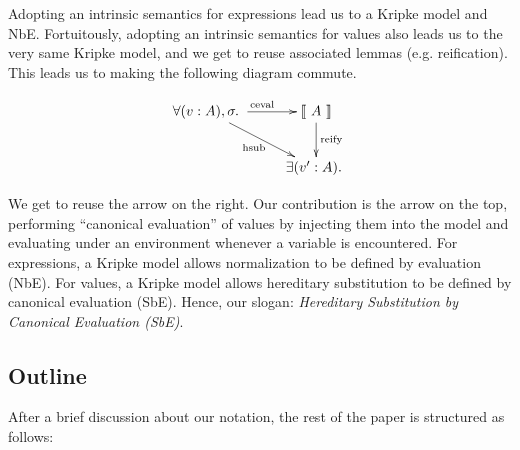 \documentclass[preprint,nonatbib]{sigplanconf}
\numberwithin{mysubdfn}{mydfn}
\newcommand{\ascribe}[2]{(#1 : #2)}
\newcommand{\all}[1]{\forall#1.~}
\newcommand{\ex}[1]{\exists#1.~}
\newcommand{\el}[1]{\llbracket ~ #1 ~ \rrbracket}
\newcommand{\fun}[1]{\textmd{#1}}
\begin{document}
Adopting an intrinsic semantics for expressions lead us to a Kripke
model and NbE. Fortuitously, adopting an intrinsic semantics for
values also leads us to the very same Kripke model, and we get to
reuse associated lemmas (e.g. reification). This leads us to making
the following diagram commute.

\begin{displaymath}
    \xymatrix{
          \all{\ascribe{v}{A}, \sigma}
          \ar[dr]_{\fun{hsub}}
          \ar[r]^{\fun{ceval}}
        & {\el{A}}
          \ar[d]^{\large{\fun{reify}}}
\\      & \ex{\ascribe{v'}{A}} }
\end{displaymath}

We get to reuse the arrow on the right. Our contribution is the arrow
on the top, performing ``canonical evaluation'' of values by injecting
them into the model and evaluating under an environment whenever a
variable is encountered. For expressions, a Kripke model allows
normalization to be defined by evaluation (NbE). For values, a Kripke
model allows hereditary substitution to be defined by canonical
evaluation (SbE). Hence, our slogan:
{\it Hereditary Substitution by Canonical Evaluation (SbE)}.

\subsection{Outline}

After a brief discussion about our notation, the rest of the paper is
structured as follows:
\end{document}
